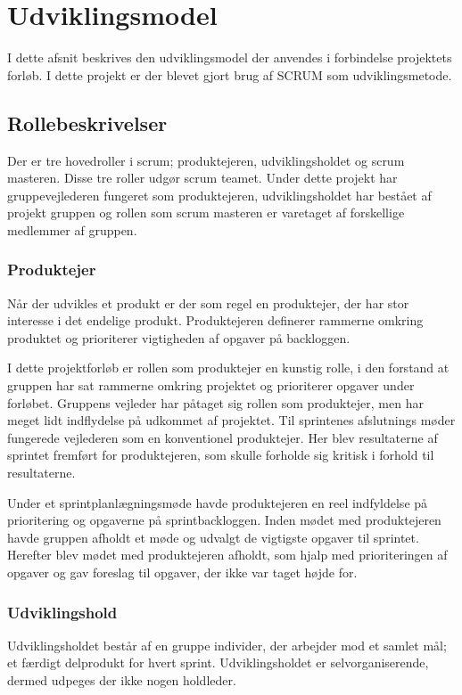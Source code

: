 \chapter{Udviklingsmodel}
I dette afsnit beskrives den udviklingsmodel der anvendes i forbindelse projektets forløb. I dette projekt er der blevet gjort brug af SCRUM som udviklingsmetode.

	\section{Rollebeskrivelser}
	Der er tre hovedroller i scrum; produktejeren, udviklingsholdet og scrum masteren. Disse tre roller udgør scrum teamet. Under dette projekt har gruppevejlederen fungeret som produktejeren, udviklingsholdet har bestået af projekt gruppen og rollen som scrum masteren er varetaget af forskellige medlemmer af gruppen.
	
	\subsection{Produktejer}
	Når der udvikles et produkt er der som regel en produktejer, der har stor interesse i det endelige produkt. Produktejeren definerer rammerne omkring produktet og prioriterer vigtigheden af opgaver på backloggen. \newline
	
	I dette projektforløb er rollen som produktejer en kunstig rolle, i den forstand at gruppen har sat rammerne omkring projektet og prioriterer opgaver under forløbet. Gruppens vejleder har påtaget sig rollen som produktejer, men har meget lidt indflydelse på udkommet af projektet. Til sprintenes afslutnings møder fungerede vejlederen som en konventionel produktejer. Her blev resultaterne af sprintet fremført for produktejeren, som skulle forholde sig kritisk i forhold til resultaterne.
	
	Under et sprintplanlægningsmøde havde produktejeren en reel indfyldelse på prioritering og opgaverne på sprintbackloggen. Inden mødet med produktejeren havde gruppen afholdt et møde og udvalgt de vigtigste opgaver til sprintet. Herefter blev mødet med produktejeren afholdt, som hjalp med prioriteringen af opgaver og gav foreslag til opgaver, der ikke var taget højde for.  
	
	\subsection{Udviklingshold}
	Udviklingsholdet består af en gruppe individer, der arbejder mod et samlet mål; et færdigt delprodukt for hvert sprint. Udviklingsholdet er selvorganiserende, dermed udpeges der ikke nogen holdleder. \newline
	
